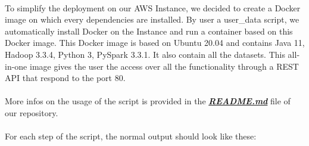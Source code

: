 \paragraph{}To simplify the deployment on our AWS Instance, we decided to create a Docker image on which every dependencies are installed. By user a user\_data script, we automatically install Docker on the Instance and run a container based on this Docker image. This Docker image is based on Ubuntu 20.04 and contains Java 11, Hadoop 3.3.4, Python 3, PySpark 3.3.1. It also contain all the datasets. This all-in-one image gives the user the access over all the functionality through a REST API that respond to the port 80.

\paragraph{}More infos on the usage of the script is provided in the \href{https://github.com/JordMim/LOG8415E/blob/main/tp2/README.md}{\textbf{\emph{README.md}}} file of our repository.

\paragraph{}For each step of the script, the normal output should look like these:

